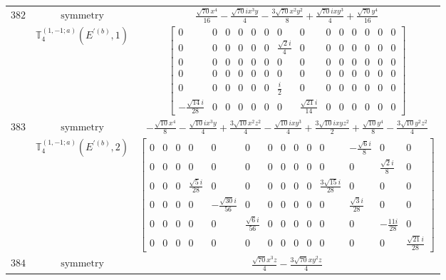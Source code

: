 \documentclass[fleqn,8pt,landscape]{jsarticle}
\begin{document}
\begin{longtable}{ccc}
$ 382 $ & $ \text{symmetry} $ & $ \frac{\sqrt{70} x^{4}}{16} - \frac{\sqrt{70} i x^{3} y}{4} - \frac{3 \sqrt{70} x^{2} y^{2}}{8} + \frac{\sqrt{70} i x y^{3}}{4} + \frac{\sqrt{70} y^{4}}{16} $ \\
$  $ & $ \mathbb{T}_{4}^{(1,-1;a)}(E^{\prime(b)},1) $ & $ \begin{bmatrix} 0 & 0 & 0 & 0 & 0 & 0 & 0 & 0 & 0 & 0 & 0 & 0 & 0 & 0 \\ 0 & 0 & 0 & 0 & 0 & 0 & \frac{\sqrt{2} i}{4} & 0 & 0 & 0 & 0 & 0 & 0 & 0 \\ 0 & 0 & 0 & 0 & 0 & 0 & 0 & 0 & 0 & 0 & 0 & 0 & 0 & 0 \\ 0 & 0 & 0 & 0 & 0 & 0 & 0 & 0 & 0 & 0 & 0 & 0 & 0 & 0 \\ 0 & 0 & 0 & 0 & 0 & 0 & \frac{i}{2} & 0 & 0 & 0 & 0 & 0 & 0 & 0 \\ - \frac{\sqrt{14} i}{28} & 0 & 0 & 0 & 0 & 0 & 0 & \frac{\sqrt{21} i}{14} & 0 & 0 & 0 & 0 & 0 & 0 \end{bmatrix} $ \\ \hline
$ 383 $ & $ \text{symmetry} $ & $ - \frac{\sqrt{10} x^{4}}{8} - \frac{\sqrt{10} i x^{3} y}{4} + \frac{3 \sqrt{10} x^{2} z^{2}}{4} - \frac{\sqrt{10} i x y^{3}}{4} + \frac{3 \sqrt{10} i x y z^{2}}{2} + \frac{\sqrt{10} y^{4}}{8} - \frac{3 \sqrt{10} y^{2} z^{2}}{4} $ \\
$  $ & $ \mathbb{T}_{4}^{(1,-1;a)}(E^{\prime(b)},2) $ & $ \begin{bmatrix} 0 & 0 & 0 & 0 & 0 & 0 & 0 & 0 & 0 & 0 & 0 & - \frac{\sqrt{6} i}{8} & 0 & 0 \\ 0 & 0 & 0 & 0 & 0 & 0 & 0 & 0 & 0 & 0 & 0 & 0 & \frac{\sqrt{2} i}{8} & 0 \\ 0 & 0 & 0 & \frac{\sqrt{5} i}{28} & 0 & 0 & 0 & 0 & 0 & 0 & \frac{3 \sqrt{15} i}{28} & 0 & 0 & 0 \\ 0 & 0 & 0 & 0 & - \frac{\sqrt{30} i}{56} & 0 & 0 & 0 & 0 & 0 & 0 & \frac{\sqrt{3} i}{28} & 0 & 0 \\ 0 & 0 & 0 & 0 & 0 & \frac{\sqrt{6} i}{56} & 0 & 0 & 0 & 0 & 0 & 0 & - \frac{11 i}{28} & 0 \\ 0 & 0 & 0 & 0 & 0 & 0 & 0 & 0 & 0 & 0 & 0 & 0 & 0 & \frac{\sqrt{21} i}{28} \end{bmatrix} $ \\ \hline
$ 384 $ & $ \text{symmetry} $ & $ \frac{\sqrt{70} x^{3} z}{4} - \frac{3 \sqrt{70} x y^{2} z}{4} $ \\

\end{longtable}
\end{document}
